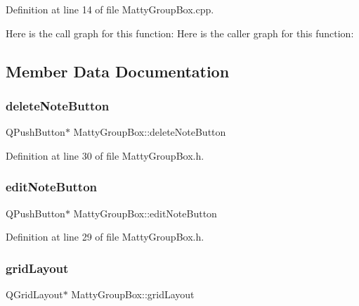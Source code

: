 Definition at line 14 of file Matty\+Group\+Box.\+cpp.

Here is the call graph for this function\+:
Here is the caller graph for this function\+:


\subsection{Member Data Documentation}
\hypertarget{classMattyGroupBox_ab51a570cfe8b06f8ae06a7163fb09d4f}{}\label{classMattyGroupBox_ab51a570cfe8b06f8ae06a7163fb09d4f} 
\subsubsection{\texorpdfstring{delete\+Note\+Button}{deleteNoteButton}}
{\footnotesize\ttfamily Q\+Push\+Button$\ast$ Matty\+Group\+Box\+::delete\+Note\+Button\hspace{0.3cm}{\ttfamily [private]}}



Definition at line 30 of file Matty\+Group\+Box.\+h.

\hypertarget{classMattyGroupBox_a3237eef2287c1b2fcff14d226ef9116d}{}\label{classMattyGroupBox_a3237eef2287c1b2fcff14d226ef9116d} 
\subsubsection{\texorpdfstring{edit\+Note\+Button}{editNoteButton}}
{\footnotesize\ttfamily Q\+Push\+Button$\ast$ Matty\+Group\+Box\+::edit\+Note\+Button\hspace{0.3cm}{\ttfamily [private]}}



Definition at line 29 of file Matty\+Group\+Box.\+h.

\hypertarget{classMattyGroupBox_a02436c3690d2007eb0cba523bcb668ea}{}\label{classMattyGroupBox_a02436c3690d2007eb0cba523bcb668ea} 
\subsubsection{\texorpdfstring{grid\+Layout}{gridLayout}}
{\footnotesize\ttfamily Q\+Grid\+Layout$\ast$ Matty\+Group\+Box\+::grid\+Layout\hspace{0.3cm}{\ttfamily [private]}}



